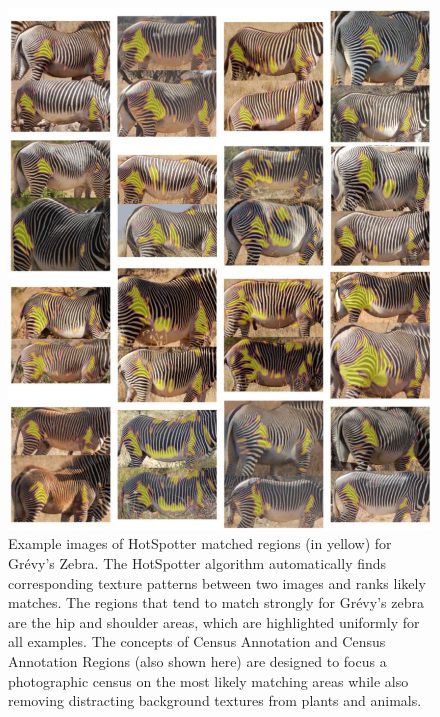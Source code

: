 \begin{figure}[!t]
    \begin{center}
        \includegraphics[width=0.85\linewidth]{resources/ca_regions_examples.pdf}
    \end{center}
    \caption{Example images of HotSpotter matched regions (in yellow) for Gr\'evy's Zebra.  The HotSpotter algorithm automatically finds corresponding texture patterns between two images and ranks likely matches.  The regions that tend to match strongly for Gr\'evy's zebra are the hip and shoulder areas, which are highlighted uniformly for all examples.  The concepts of Census Annotation and Census Annotation Regions (also shown here) are designed to focus a photographic census on the most likely matching areas while also removing distracting background textures from plants and animals.}
    \label{fig:ca-region-examples}
\end{figure}

